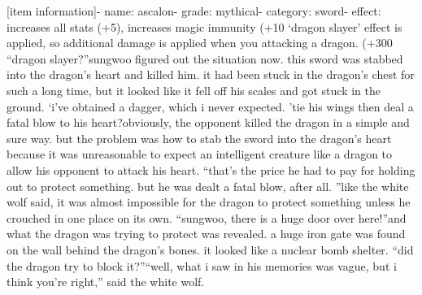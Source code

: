 [item information]- name: ascalon- grade: mythical- category: sword- effect: increases all stats (+5), increases magic immunity (+10%
 ‘dragon slayer’ effect is applied, so additional damage is applied when you attacking a dragon.
 (+300%
“dragon slayer?”sungwoo figured out the situation now.
 this sword was stabbed into the dragon’s heart and killed him.
it had been stuck in the dragon’s chest for such a long time, but it looked like it fell off his scales and got stuck in the ground.
‘i’ve obtained a dagger, which i never expected.
’tie his wings then deal a fatal blow to his heart?obviously, the opponent killed the dragon in a simple and sure way.
but the problem was how to stab the sword into the dragon’s heart because it was unreasonable to expect an intelligent creature like a dragon to allow his opponent to attack his heart.
“that’s the price he had to pay for holding out to protect something.
 but he was dealt a fatal blow, after all.
”like the white wolf said, it was almost impossible for the dragon to protect something unless he crouched in one place on its own.
“sungwoo, there is a huge door over here!”and what the dragon was trying to protect was revealed.
 a huge iron gate was found on the wall behind the dragon’s bones.
 it looked like a nuclear bomb shelter.
“did the dragon try to block it?”“well, what i saw in his memories was vague, but i think you’re right,” said the white wolf.


 